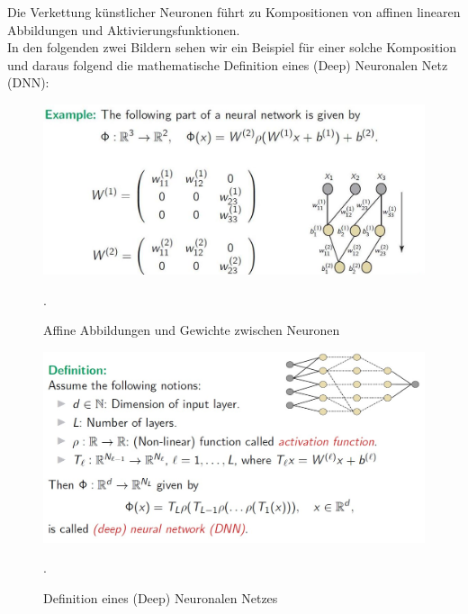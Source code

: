\documentclass[12pt]{article}
\begin{document}
Die Verkettung künstlicher Neuronen führt zu Kompositionen von affinen linearen Abbildungen und Aktivierungsfunktionen.\\
In den folgenden zwei Bildern sehen wir ein Beispiel für einer solche Komposition und daraus folgend die mathematische Definition eines (Deep) Neuronalen Netz (DNN): 
\begin{figure}[ht]
  \centering
  \hspace*{-0.5cm} 
  \includegraphics[width=1.15\textwidth]{Mapping+Weights}
  \caption{Affine Abbildungen und Gewichte zwischen Neuronen}.\\[0.2cm]      
  \label{fig:Map+Weights}
\end{figure}
%
\begin{figure}[ht]
  \centering
  \hspace*{-0.5cm} 
  \includegraphics[width=1.15\textwidth]{Definition-Deep-NN}
  \caption{Definition eines (Deep) Neuronalen Netzes}.\\[0.2cm]      
  \label{fig:def-DNN}
\end{figure}\\
%
\newpage
%
{\color{red}{*******************************************************************\\ab hier werden weitere mathematischen Grundlagen bald eingefügt werden\\
********************************************************************\\}}
%
\newpage
\end{document}
